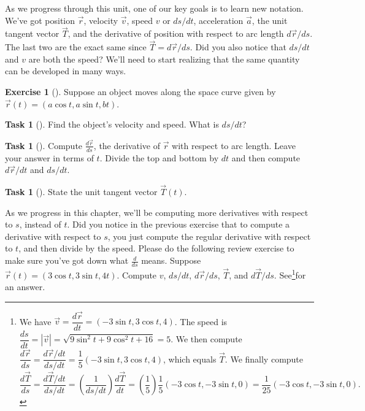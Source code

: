 \documentclass[10pt,]{book}
\theoremstyle{plain}
\theoremstyle{definition}
\theoremstyle{definition}
\theoremstyle{definition}
\theoremstyle{definition}
\newtheorem{exploration}[project]{Exercise}
\newtheorem{task}[project]{Task}
\theoremstyle{definition}
\numberwithin{equation}{section}
\begin{document}
As we progress through this unit, one of our key goals is to learn new notation. We've got position \(\vec r\), velocity \(\vec v\), speed \(v\) or \(ds/dt\), acceleration \(\vec a\), the unit tangent vector \(\vec T\), and the derivative of position with respect to arc length \(d\vec r/ds\). The last two are the exact same since \(\vec T = d\vec r/ds\). Did you also notice that \(ds/dt\) and \(v\) are both the speed? We'll need to start realizing that the same quantity can be developed in many ways.%
\begin{exploration}[]\label{exploration-169}
Suppose an object moves along the space curve given by \(\vec r(t)=(a\cos t,a\sin t,b t)\).%
\begin{task}[]\label{task-398}
Find the object's velocity and speed. What is \(ds/dt\)?%
\end{task}
\begin{task}[]\label{task-399}
Compute \(\frac{d\vec r}{ds}\), the derivative of \(\vec r\) with respect to arc length. Leave your answer in terms of \(t\). Divide the top and bottom by \(dt\) and then compute \(d\vec r/dt\) and \(ds/dt\).%
%
\end{task}
\begin{task}[]\label{task-400}
State the unit tangent vector \(\vec T(t)\).%
\end{task}
\end{exploration}
As we progress in this chapter, we'll be computing more derivatives with respect to \(s\), instead of \(t\). Did you notice in the previous exercise that to compute a derivative with respect to \(s\), you just compute the regular derivative with respect to \(t\), and then divide by the speed. Please do the following review exercise to make sure you've got down what \(\frac{d}{ds}\) means.%
Suppose \(\vec r(t)=(3\cos t,3\sin t,4t)\). Compute \(v\), \(ds/dt\), \(d\vec r/ds\), \(\vec T\), and \(d\vec T/ds\). See\footnote{We have \(\vec v = \dfrac{d\vec r}{dt} = (-3\sin t, 3\cos t, 4)\). The speed is \(\dfrac{ds}{dt}=|\vec v| = \sqrt{9\sin^2t+9\cos^2t+16}=5\). We then compute \(\dfrac{d\vec r}{ds}=\dfrac{d\vec r/dt}{ds/dt} = \dfrac{1}{5}(-3\sin t, 3\cos t, 4)\), which equals \(\vec T\). We finally compute%
\begin{equation*}
\dfrac{d\vec T}{ds}=\dfrac{d\vec T/dt}{ds/dt}=\left(\dfrac{1}{ds/dt}\right)\dfrac{d\vec T}{dt} = \left(\dfrac{1}{5}\right)\dfrac{1}{5}(-3\cos t, -3\sin t, 0) =  \dfrac{1}{25}(-3\cos t, -3\sin t, 0).
\end{equation*}
\label{fn-10}}for an answer.%
\typeout{************************************************}
\typeout{************************************************}
\end{document}
